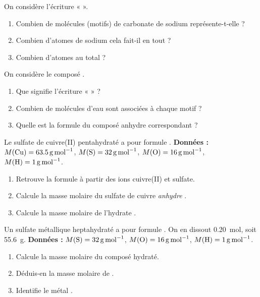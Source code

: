 \documentclass[11pt,a4paper]{article}
\begin{document}
\begin{exo}
On considère l'écriture «  ».
\begin{enumerate}[label=\alph*)]
  \item Combien de molécules (motifs) de carbonate de sodium représente-t-elle ?
  \item Combien d'atomes de sodium cela fait-il en tout ?
  \item Combien d'atomes au total ?
\end{enumerate}
\end{exo}

\begin{exo}
On considère le composé .
\begin{enumerate}[label=\alph*)]
  \item Que signifie l'écriture «  » ?
  \item Combien de molécules d'eau sont associées à chaque motif ?
  \item Quelle est la formule du composé anhydre correspondant ?
\end{enumerate}
\end{exo}

\begin{exo}
Le sulfate de cuivre(II) pentahydraté a pour formule . \textbf{Données :}
$M(\ce{Cu})=\qty{63,5}{\gram\per\mol}$, $M(\ce{S})=\qty{32}{\gram\per\mol}$,
$M(\ce{O})=\qty{16}{\gram\per\mol}$, $M(\ce{H})=\qty{1}{\gram\per\mol}$.
\begin{enumerate}[label=\alph*)]
  \item Retrouve la formule  à partir des ions cuivre(II) et sulfate.
  \item Calcule la masse molaire du sulfate de cuivre \emph{anhydre} .
  \item Calcule la masse molaire de l'hydrate .
\end{enumerate}
\end{exo}

\begin{exo}
Un sulfate métallique heptahydraté a pour formule . On en dissout \qty{0,20}{\mol}, soit
\qty{55,6}{\gram}. \textbf{Données :} $M(\ce{S})=\qty{32}{\gram\per\mol}$,
$M(\ce{O})=\qty{16}{\gram\per\mol}$, $M(\ce{H})=\qty{1}{\gram\per\mol}$.
\begin{enumerate}[label=\alph*)]
  \item Calcule la masse molaire du composé hydraté.
  \item Déduis-en la masse molaire de .
  \item Identifie le métal .
\end{enumerate}
\end{exo}
\end{document}
